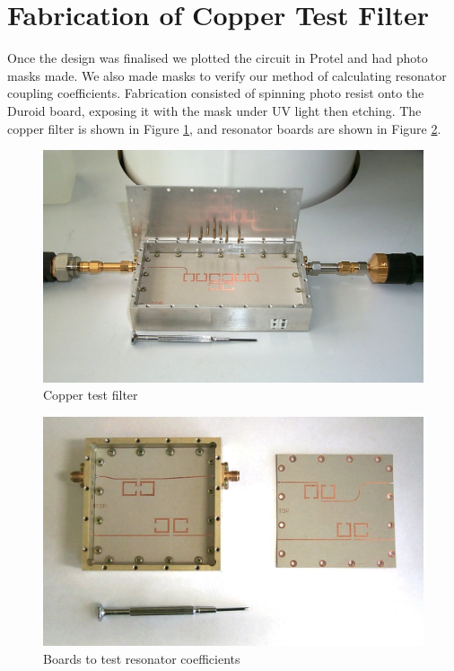 \section{Fabrication of Copper Test Filter}

Once the design was finalised we plotted the circuit in Protel and had photo masks made. We also made masks to verify our method of calculating resonator coupling coefficients. Fabrication consisted of spinning photo resist onto the Duroid board, exposing it with the mask under UV light then etching. The copper filter is shown in Figure \ref{figure:test-copper-open}, and resonator boards are shown in Figure \ref{figure:test-resonator-open}.

\begin{figure}[ht]
\begin{center}
\includegraphics[scale=0.25]{fig/test-copper-open.jpg}
\end{center}
\vspace{-1em}
\caption{Copper test filter}
\label{figure:test-copper-open}
\end{figure}

\begin{figure}[ht]
\begin{center}
\includegraphics[scale=0.25]{fig/test-resonator-open.jpg}
\end{center}
\vspace{-1em}
\caption{Boards to test resonator coefficients}
\label{figure:test-resonator-open}
\end{figure}


